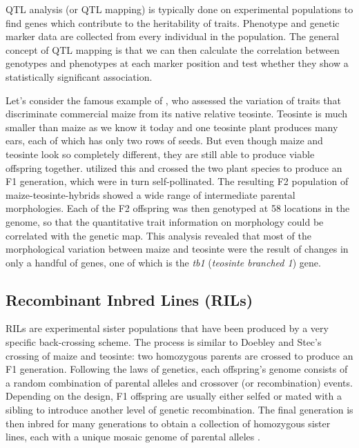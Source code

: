 \documentclass[12pt,]{krantz}
\theoremstyle{definition}
\theoremstyle{definition}
\theoremstyle{remark}
\begin{document}
QTL analysis (or QTL mapping) is typically done on experimental
populations to find genes which contribute to the heritability of
traits. Phenotype and genetic marker data are collected from every
individual in the population. The general concept of QTL mapping is that
we can then calculate the correlation between genotypes and phenotypes
at each marker position and test whether they show a statistically
significant association.

Let's consider the famous example of \citet{Doebley285}, who assessed
the variation of traits that discriminate commercial maize from its
native relative teosinte. Teosinte is much smaller than maize as we know
it today and one teosinte plant produces many ears, each of which has
only two rows of seeds. But even though maize and teosinte look so
completely different, they are still able to produce viable offspring
together. \citet{Doebley285} utilized this and crossed the two plant
species to produce an F1 generation, which were in turn self-pollinated.
The resulting F2 population of maize-teosinte-hybrids showed a wide
range of intermediate parental morphologies. Each of the F2 offspring
was then genotyped at 58 locations in the genome, so that the
quantitative trait information on morphology could be correlated with
the genetic map. This analysis revealed that most of the morphological
variation between maize and teosinte were the result of changes in only
a handful of genes, one of which is the \emph{tb1} (\emph{teosinte
branched 1}) gene.

\subsection{Recombinant Inbred Lines
(RILs)}\label{recombinant-inbred-lines-rils}

RILs are experimental sister populations that have been produced by a
very specific back-crossing scheme. The process is similar to Doebley
and Stec's crossing of maize and teosinte: two homozygous parents are
crossed to produce an F1 generation. Following the laws of genetics,
each offspring's genome consists of a random combination of parental
alleles and crossover (or recombination) events. Depending on the
design, F1 offspring are usually either selfed or mated with a sibling
to introduce another level of genetic recombination. The final
generation is then inbred for many generations to obtain a collection of
homozygous sister lines, each with a unique mosaic genome of parental
alleles \citep{Pollard2012}.
\end{document}
